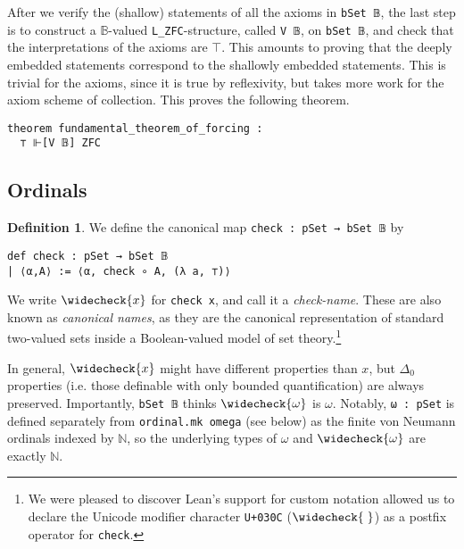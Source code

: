 \documentclass[sigplan,screen]{acmart}
\newcommand{\lil}{\lstinline}
\newcommand{\N}{\mathbb{N}}
\theoremstyle{definition}
\newtheorem{defn}{Definition}[section]
\begin{document}
After we verify the (shallow) statements of all the axioms in \lil{bSet 𝔹}, the last step is to construct a \(\mathbb{B}\)-valued \lil{L_ZFC}-structure, called \lil{V 𝔹}, on \lil{bSet 𝔹}, and check that the interpretations of the axioms are \(\top\). This amounts to proving that the deeply embedded statements correspond to the shallowly embedded statements. This is trivial for the axioms, since it is true by reflexivity, but takes more work for the axiom scheme of collection. This proves the following theorem.
\begin{lstlisting}
theorem fundamental_theorem_of_forcing :
  ⊤ ⊩[V 𝔹] ZFC
\end{lstlisting}
\subsection{Ordinals}
\begin{defn}\label{def:check}
  We define the canonical map \lil{check : pSet → bSet 𝔹} by
  \begin{lstlisting}
def check : pSet → bSet 𝔹
| ⟨α,A⟩ := ⟨α, check ∘ A, (λ a, ⊤)⟩
  \end{lstlisting}
  We write $\widecheck{x}$ for \lil{check x}, and call it a \emph{check-name}.
  These are also known as \emph{canonical names}, as they are the canonical representation of standard two-valued sets inside a Boolean-valued model of set theory.\footnote{We were pleased to discover Lean's support for custom notation allowed us to declare the Unicode modifier character \texttt{U+030C} ($\widecheck{\hspace{1mm}}$) as a postfix operator for \texttt{check}.}
\end{defn}

In general, $\widecheck{x}$ might have different properties than $x$, but \(\Delta_0\) properties (i.e. those definable with only bounded quantification) are always preserved. Importantly, \lil{bSet 𝔹} thinks $\widecheck{\omega}$ is $\omega$. Notably, \lil{ω : pSet} is defined separately from \lil{ordinal.mk omega} (see below) as the finite von Neumann ordinals indexed by $\mathbb{N}$, so the underlying types of \(\omega\) and \(\widecheck{\omega}\) are exactly \(\N\). %
\end{document}
